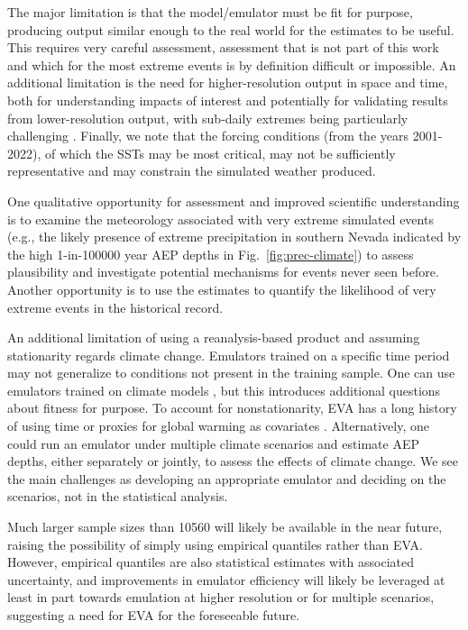 \documentclass{ametsocV6.1}
\begin{document}
The major limitation is that the model/emulator must be fit for purpose, producing output similar enough to the real world for the estimates to be useful. This requires very careful assessment, assessment that is not part of this work and which for the most extreme events is by definition difficult or impossible. An additional limitation is the need for higher-resolution output in space and time, both for understanding impacts of interest and potentially for validating results from lower-resolution output, with sub-daily extremes being particularly challenging \citep{nasem2024pmp}. Finally, we note that the forcing conditions (from the years 2001-2022), of which the SSTs may be most critical, may not be sufficiently representative and may constrain the simulated weather produced.

One qualitative opportunity for assessment and improved scientific understanding  is to examine the meteorology associated with very extreme simulated events (e.g., the likely presence of extreme precipitation in southern Nevada indicated by the high 1-in-100000 year AEP depths in Fig.\ \ref{fig:prec-climate}) to assess plausibility and investigate potential mechanisms for events never seen before. Another opportunity is to use the estimates to quantify the likelihood of very extreme events in the historical record.

An additional limitation of using a reanalysis-based product and assuming stationarity regards climate change. Emulators trained on a specific time period may not generalize to conditions not present in the training sample. One can use emulators trained on climate models \citep[e.g.,][]{watt2025ace2}, but this introduces additional questions about fitness for purpose. To account for nonstationarity, EVA has a long history of using time or proxies for global warming as covariates \citep{coles2001introduction,westra2013global,risser2019probabilistic}. Alternatively, one could run an emulator under multiple climate scenarios and estimate AEP depths, either separately or jointly, to assess the effects of climate change. We see the main challenges as developing an appropriate emulator and deciding on the scenarios, not in the statistical analysis.

Much larger sample sizes than 10560 will likely be available in the near future, raising the possibility of simply using empirical quantiles rather than EVA. However, empirical quantiles are also statistical estimates with associated uncertainty, and improvements in emulator efficiency will likely be leveraged at least in part towards emulation at higher resolution or for multiple scenarios, suggesting a need for EVA for the foreseeable future.
\end{document}
